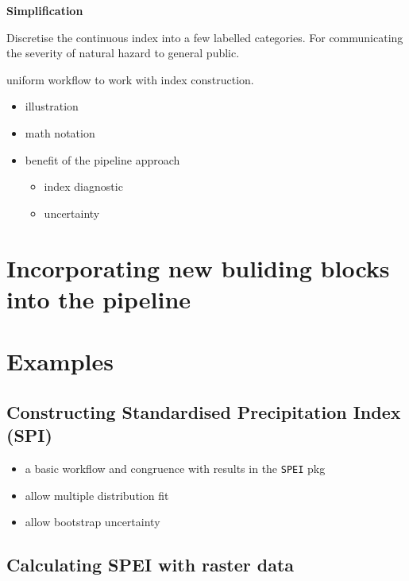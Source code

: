 \documentclass[
]{article}
\providecommand{\tightlist}{%
  \setlength{\itemsep}{0pt}\setlength{\parskip}{0pt}}\usepackage{longtable,booktabs,array}
\begin{document}
\textbf{Simplification}

Discretise the continuous index into a few labelled categories. For
communicating the severity of natural hazard to general public.

uniform workflow to work with index construction.

\begin{itemize}
\tightlist
\item
  illustration
\item
  math notation
\item
  benefit of the pipeline approach

  \begin{itemize}
  \tightlist
  \item
    index diagnostic
  \item
    uncertainty
  \end{itemize}
\end{itemize}

\hypertarget{sec-incorporating-new-buliding-blocks-into-the-pipeline}{%
\section{Incorporating new buliding blocks into the
pipeline}\label{sec-incorporating-new-buliding-blocks-into-the-pipeline}}

\hypertarget{sec-examples}{%
\section{Examples}\label{sec-examples}}

\hypertarget{constructing-standardised-precipitation-index-spi}{%
\subsection{Constructing Standardised Precipitation Index
(SPI)}\label{constructing-standardised-precipitation-index-spi}}

\begin{itemize}
\tightlist
\item
  a basic workflow and congruence with results in the \texttt{SPEI} pkg
\item
  allow multiple distribution fit
\item
  allow bootstrap uncertainty
\end{itemize}

\hypertarget{calculating-spei-with-raster-data}{%
\subsection{Calculating SPEI with raster
data}\label{calculating-spei-with-raster-data}}
\end{document}
